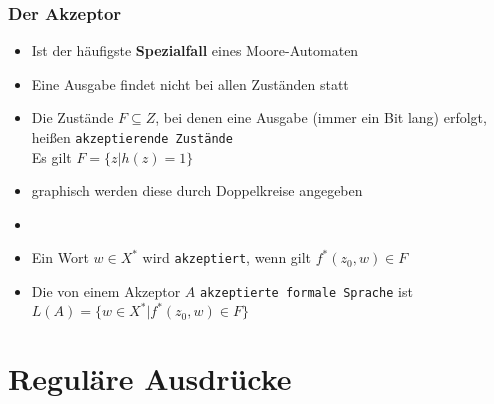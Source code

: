 \begin{frame}
   \frametitle{Der Akzeptor}

   \begin{itemize}
     \item \vspace{-1.4em} Ist der häufigste \textbf{Spezialfall} eines Moore-Automaten
     \item Eine Ausgabe findet nicht bei allen Zuständen statt \pause
     \item Die Zustände $F \subseteq Z$, bei denen eine Ausgabe (immer ein Bit lang) erfolgt, heißen \texttt{akzeptierende Zustände} \\
     Es gilt $F=\{z|h(z)=1\}$ \pause
     \item graphisch werden diese durch Doppelkreise angegeben
     		\begin{center}
      	\end{center} \pause
     \item[]
     \item Ein Wort $w\in X^*$ wird \texttt{akzeptiert}, wenn gilt $f^*(z_0,w)\in F$
     \item Die von einem Akzeptor $A$ \texttt{akzeptierte formale Sprache} ist $L(A)=\{w \in X^* |f^*(z_0,w)\in F\}$
   \end{itemize}
 \end{frame}

\section{Reguläre Ausdrücke}
\subsection*{}


